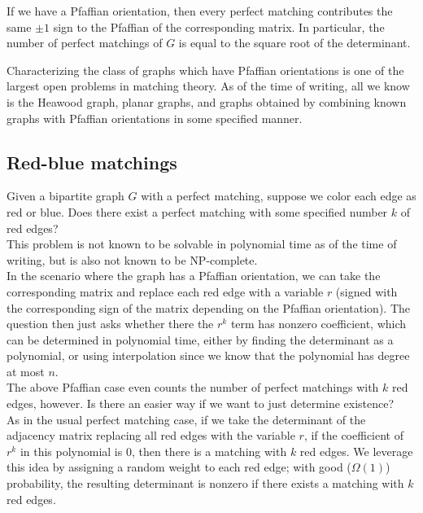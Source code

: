 \begin{fprop}
	If we have a Pfaffian orientation, then every perfect matching contributes the same $\pm 1$ sign to the Pfaffian of the corresponding matrix. In particular, the number of perfect matchings of $G$ is equal to the square root of the determinant.
\end{fprop}

Characterizing the class of graphs which have Pfaffian orientations is one of the largest open problems in matching theory. As of the time of writing, all we know is the Heawood graph, planar graphs, and graphs obtained by combining known graphs with Pfaffian orientations in some specified manner.


\subsection{Red-blue matchings}

Given a bipartite graph $G$ with a perfect matching, suppose we color each edge as red or blue. Does there exist a perfect matching with some specified number $k$ of red edges?\\
This problem is not known to be solvable in polynomial time as of the time of writing, but is also not known to be \textsf{NP}-complete.\\
In the scenario where the graph has a Pfaffian orientation, we can take the corresponding matrix and replace each red edge with a variable $r$ (signed with the corresponding sign of the matrix depending on the Pfaffian orientation). The question then just asks whether there the $r^k$ term has nonzero coefficient, which can be determined in polynomial time, either by finding the determinant as a polynomial, or using interpolation since we know that the polynomial has degree at most $n$.\\

The above Pfaffian case even counts the number of perfect matchings with $k$ red edges, however. Is there an easier way if we want to just determine existence?\\
As in the usual perfect matching case, if we take the determinant of the adjacency matrix replacing all red edges with the variable $r$, if the coefficient of $r^k$ in this polynomial is $0$, then there is a matching with $k$ red edges. We leverage this idea by assigning a random weight to each red edge; with good ($\Omega(1)$) probability, the resulting determinant is nonzero if there exists a matching with $k$ red edges.


